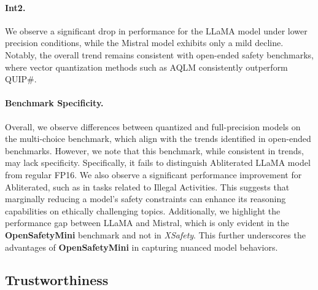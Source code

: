 \paragraph{Int2.}
We observe a significant drop in performance for the LLaMA model under lower precision conditions, while the Mistral model exhibits only a mild decline. Notably, the overall trend remains consistent with open-ended safety benchmarks, where vector quantization methods such as AQLM consistently outperform QUIP\#.


\paragraph{Benchmark Specificity.}  
Overall, we observe differences between quantized and full-precision models on the multi-choice benchmark, which align with the trends identified in open-ended benchmarks. However, we note that this benchmark, while consistent in trends, may lack specificity. Specifically, it fails to distinguish {Abliterated LLaMA} model from regular FP16. We also observe a significant performance improvement for Abliterated, such as in tasks related to {Illegal Activities}. This suggests that marginally reducing a model's safety constraints can enhance its reasoning capabilities on ethically challenging topics. Additionally, we highlight the performance gap between {LLaMA} and {Mistral}, which is only evident in the \textbf{OpenSafetyMini} benchmark and not in \textit{XSafety}. This further underscores the advantages of \textbf{OpenSafetyMini} in capturing nuanced model behaviors.


\subsection{Trustworthiness}

